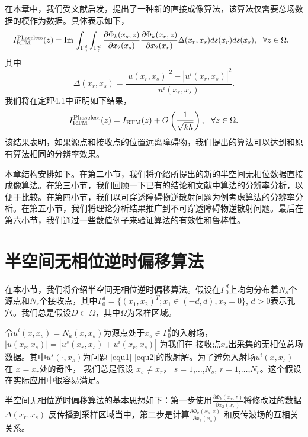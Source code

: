 在本章中，我们受文献\cite{ch_pha}启发，提出了一种新的直接成像算法，该算法仅需要总场数据的模作为数据。具体表示如下，
\begin{equation}\label{IPhaseless}
\quad  I^{\rm Phaseless}_{\rm RTM}(z)=\Im\int_{\Gamma_{0}^d}\int_{\Gamma_0^d}\frac{\partial\Phi_k(x_s,z)}{\partial x_2(x_s)}\frac{\partial\Phi_k(x_r,z)}{\partial x_2(x_r)}
  \Delta(x_r,x_s)ds(x_r)ds(x_s),\  \  \forall z\in\Omega.\hspace{0.6cm}
\end{equation}
其中
 \begin{equation}
   \Delta(x_r,x_s)=\frac{|u(x_r,x_s)|^2-|u^i(x_r,x_s)|^2}{u^i(x_r,x_s)}.
 \end{equation}
我们将在定理4.1中证明如下结果，
\begin{equation}
  I^{\rm Phaseless}_{\rm RTM}(z)=I_{\rm RTM}(z)+O\left(\frac{1}{\sqrt{kh}}\right),\  \  \forall z\in\Omega.
\end{equation}
该结果表明，如果源点和接收点的位置远离障碍物，我们提出的算法可以达到和原有算法相同的分辨率效果。

本章结构安排如下。在第二小节，我们将介绍所提出的新的半空间无相位数据直接成像算法。在第三小节，我们回顾一下已有的结论和文献\cite{ch_ha}中算法的分辨率分析，以便于比较。在第四小节，我们以可穿透障碍物逆散射问题为例考虑算法的分辨率分析。在第五小节，我们将理论分析结果推广到不可穿透障碍物逆散射问题。最后在第六小节，我们通过一些数值例子来验证算法的有效性和鲁棒性。
\section{半空间无相位逆时偏移算法}
在本小节，我们将介绍半空间无相位逆时偏移算法。假设在$\Gamma_0^d$上均匀分布着$N_s$个源点和$N_r$个接收点，其中$\Gamma_0^d=\{(x_1,x_2)^T;x_1\in(-d,d),x_2=0\}$, $d>0$表示孔穴。我们总是假设$D\subset\Omega$，其中$\Omega$为采样区域。

令$u^i(x,x_s)=N_k(x,x_s)$为源点处于$x_s\in\Gamma_0^d$的入射场， $|u(x_r,x_s)|=|u^s(x_r,x_s)+u^i(x_r,x_s)|$ 为我们在
接收点$x_r$出采集的无相位总场数据。其中$u^s(\cdot,x_s)$为问题 \eqref{equ1}-\eqref{equ2}的散射解。为了避免入射场$u^i(x,x_s)$ 在 $x=x_r$处的奇性， 我们总是假设 $x_s\neq x_r$， $s=1$,$\ldots$,$N_s$, $r=1$,$\ldots$,$N_r$。这个假设在实际应用中很容易满足。

半空间无相位逆时偏移算法的基本思想如下：第一步使用$\frac{\partial\Phi_k(x_r,z)}{\partial x_2(x_r)}$将修改过的数据
$ \Delta(x_r,x_s)$ 反传播到采样区域当中，第二步是计算$\frac{\partial\Phi_k(x_s,z)}{\partial x_2(x_s)}$ 和反传波场的互相关关系。

